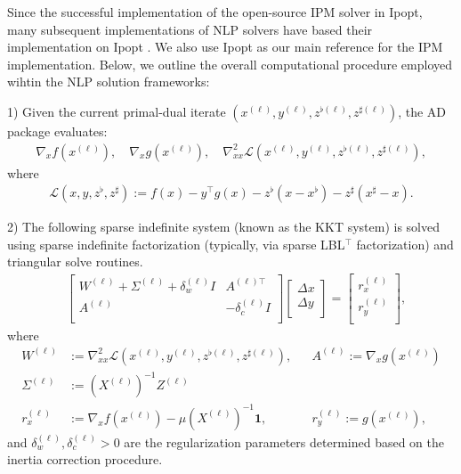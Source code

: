 Since the successful implementation of the open-source IPM solver in
Ipopt, many subsequent implementations of NLP solvers
\cite{chiang2014structured,rodriguez2023scalable,shin2021graph} have
based their implementation on Ipopt
\cite{wachter2006implementation}. We also use Ipopt as our main
reference for the IPM implementation. Below, we outline the overall
computational procedure employed wihtin the NLP solution frameworks:

1) Given the current primal-dual iterate $(x^{(\ell)},y^{(\ell)},
z^{\flat(\ell)},z^{\sharp(\ell)})$, the AD package evaluates:
\begin{align*}
  \nabla_x f(x^{(\ell)}),\quad
  \nabla_x g(x^{(\ell)}),\quad
  \nabla^2_{xx} \mathcal{L}(x^{(\ell)},y^{(\ell)},z^{\flat(\ell)},z^{\sharp(\ell)}),
\end{align*}
where
\begin{align*}
  \mathcal{L}(x,y,z^{\flat},z^{\sharp}):=f(x) - y^\top
  g(x) - z^\flat (x-x^\flat) - z^\sharp (x^\sharp-x).
\end{align*}

2) The following sparse indefinite system (known as the KKT system) is
solved using sparse indefinite factorization (typically, via sparse
LBL$^\top$ factorization) and triangular solve routines.
\begin{align}\label{eqn:kkt-indefinite}
  &\begin{bmatrix}
    W^{(\ell)}  + \Sigma^{(\ell)} + \delta^{(\ell)}_w I& A^{(\ell)\top}\\
    A^{(\ell)} & -\delta_c^{(\ell)} I\\
  \end{bmatrix}
  \begin{bmatrix}
    \Delta x\\
    \Delta y\\
  \end{bmatrix}=
  \begin{bmatrix}
    r_x^{(\ell)}\\
    r_y^{(\ell)}\\
  \end{bmatrix},
\end{align}
where
\begin{align*}
  W^{(\ell)}
  &:=\nabla^{2}_{xx}\mathcal{L}(x^{(\ell)},y^{(\ell)},z^{\flat(\ell)},z^{\sharp(\ell)}),
  &&A^{(\ell)}:= \nabla_xg(x^{(\ell)})\\
  \Sigma^{(\ell)}&:= (X^{(\ell)})^{-1}Z^{(\ell)}\\
  r_x^{(\ell)}
  &:=\nabla_x f(x^{(\ell)}) - \mu (X^{(\ell)})^{-1} \boldsymbol{1}, 
  &&r_y^{(\ell)}:=g(x^{(\ell)}),
\end{align*}
and $\delta^{(\ell)}_w, \delta^{(\ell)}_c>0$ are the regularization parameters
determined based on the inertia correction procedure.

